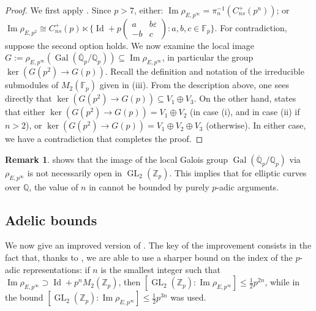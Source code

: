 \documentclass{amsart}
\newcommand{\op}[1]{\operatorname{#1}}
\newcommand{\Qp}{\mathbb{Q}_p}
\newcommand{\Qpbar}{\overline{\mathbb{Q}}_p}
\theoremstyle{definition}
\newtheorem{remark}[theorem]{Remark}
\newcommand{\Z}{\mathbb{Z}}
\newcommand{\Q}{\mathbb{Q}}
\newcommand{\GL}{\operatorname{GL}}
\numberwithin{theorem}{section}
\numberwithin{equation}{section}
\begin{document}
\begin{proof}
We first apply \cite[Theorem 1.6]{furio24}. Since $p>7$, either: $\op{Im} \rho_{E,p^{\infty}} = \pi_n^{-1}(C_{ns}^+(p^n))$; or $\op{Im} \rho_{E,p^2} \cong C_{ns}^+(p) \ltimes \{ \op{Id} + p \left(\begin{smallmatrix} a & b\varepsilon \\ -b & c \end{smallmatrix}\right) : a,b,c \in \mathbb{F}_p \}.$ For contradiction, suppose the second option holds. 
We now examine the local image $G:=\rho_{E,p^{\infty}}(\op{Gal}(\Qpbar/\Qp)) \subseteq \op{Im} \rho_{E,p^{\infty}}$, in particular the group $\ker(G(p^2) \rightarrow G(p))$. Recall the definition and notation of the irreducible submodules of $M_{2}(\mathbb{F}_p)$ given in (iii). From the description above, one sees directly that $\ker(G(p^2) \rightarrow G(p)) \subseteq V_1 \oplus V_3$.
On the other hand,  states that either $\ker(G(p^2) \to G(p)) = V_1 \oplus V_2$ (in case (i), and in case (ii) if $n>2$), or $\ker(G(p^2) \to G(p)) = V_1 \oplus V_2 \oplus V_3$ (otherwise). In either case, we have a contradiction that completes the proof.
\end{proof}

\begin{remark}
 shows that the image of the local Galois group $\op{Gal}(\Qpbar/\Qp)$ via $\rho_{E, p^\infty}$ is not necessarily open in $\GL_2(\Z_p)$. This implies that for elliptic curves over $\Q$, the value of $n$ in  cannot be bounded by purely $p$-adic arguments.
\end{remark}


\subsection{Adelic bounds} 
We now give an improved version of \cite[Theorem 1.5]{furio24}. The key of the improvement consists in the fact that, thanks to , we are able to use a sharper bound on the index of the $p$-adic representations: if $n$ is the smallest integer such that $\operatorname{Im}\rho_{E,p^\infty} \supset \op{Id} + p^nM_2(\Z_p)$, then $[\GL_2(\Z_p) : \operatorname{Im}\rho_{E,p^\infty}] \le \frac{1}{2}p^{2n}$, while in \cite{furio24} the bound $[\GL_2(\Z_p) : \operatorname{Im}\rho_{E,p^\infty}] \le \frac{1}{2}p^{3n}$ was used.
\end{document}
